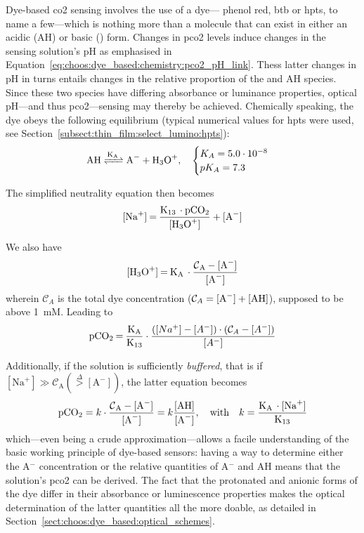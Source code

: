 Dye-based \gls{co2} sensing involves the use of a dye---\eg{} phenol red, \gls{btb} or \gls{hpts}, to name a few\cite{vurek1983, uttamlal1995, degrandpre1999, lu2008}---which is nothing more than a molecule that can exist in either an acidic (AH) or basic () form. Changes in \gls{pco2} levels induce changes in the sensing solution's pH as emphasised in Equation~\ref{eq:choos:dye_based:chemistry:pco2_pH_link}. Thess latter changes in pH in turns entails changes in the relative proportion of the  and AH species. Since these two species have differing absorbance or luminance properties, optical pH---and thus \gls{pco2}---sensing may thereby be achieved. Chemically speaking, the dye obeys the following equilibrium (typical numerical values for \gls{hpts} were used, see Section~\ref{subsect:thin_film:select_lumino:hpts}):
\begin{equation}\label{eq:choos:dye_based:chemistry:wet_dye}
	\ce{AH <=>[K_A] A^- + H_3O^+},\quad \begin{cases}
		K_A = 5.0\cdot 10^{-8} \\ pK_A = 7.3
	\end{cases}
\end{equation}

The simplified neutrality equation then becomes
\begin{equation}
	\ce{[Na^+] = \frac{K_{13} \cdot pCO_2}{[H_3O^+]} + [A^-] }
\end{equation}

We also have
\begin{equation}
	\ce{[H_3O^+] = K_A \cdot \frac{\mathcal{C}_A - [A^-]}{[A^-]}}
\end{equation}
wherein $\mathcal{C}_A$ is the total dye concentration ($\mathcal{C}_A = \ce{[A^-] + [AH]}$), supposed to be above 1~mM. Leading to
\begin{equation}\label{eq:choos:dye_based:chemistry:wet_aah_full}
	\ce{pCO_2 = \frac{K_A}{K_{13}}}\cdot \frac{\left([Na^+] - [A^-]\right)\cdot\left(\mathcal{C}_A - [A^-]\right)}{[A^-]}
\end{equation}

Additionally, if the solution is sufficiently \emph{buffered}, that is if $[\text{Na}^+] \gg \mathcal{C}_\text{A} (\overset{\Delta}{>} [\text{A}^-])$, the latter equation becomes
\begin{equation}\label{eq:choos:dye_based:chemistry:wet_aah_buff}
	\ce{pCO_2} = k \cdot \ce{\frac{\mathcal{C}_A - [A^-]}{[A^-]}} = k \ce{\frac{[AH]}{[A^-]}}, \quad \text{with} \quad k = \ce{\frac{K_A \cdot [Na^+]}{K_{13}}}
\end{equation}
which---even being a crude approximation---allows a facile understanding of the basic working principle of dye-based sensors: having a way to determine either the A$^-$ concentration or the relative quantities of A$^-$ and AH means that the solution's \gls{pco2} can be derived. The fact that the protonated and anionic forms of the dye differ in their absorbance or luminescence properties makes the optical determination of the latter quantities all the more doable, as detailed in Section~\ref{sect:choos:dye_based:optical_schemes}.


